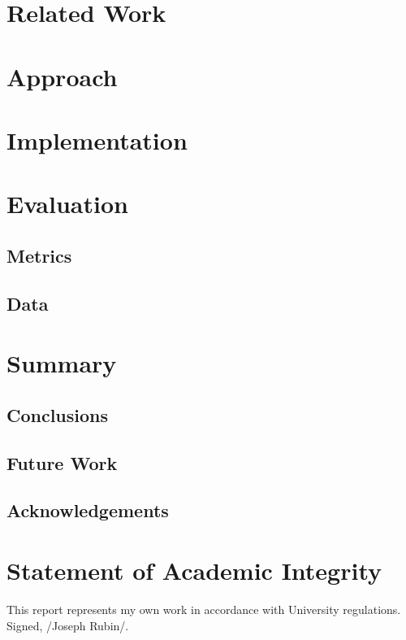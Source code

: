 \documentclass{article}
\begin{document}

\section{Related Work}


\section{Approach} 
\section{Implementation}

\section{Evaluation}
\subsection{Metrics}
\subsection{Data}
\section{Summary}
\subsection{Conclusions}
\subsection{Future Work}
\subsection{Acknowledgements}
\section*{Statement of Academic Integrity}
This report represents my own work in accordance with University regulations.\\
Signed, /Joseph Rubin/.


\end{document}
